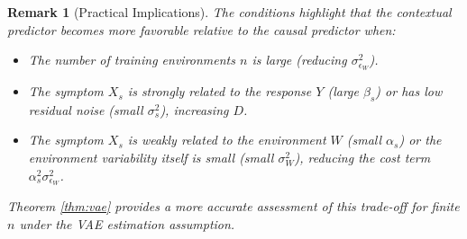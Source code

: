 \documentclass[11pt]{article}
\newtheorem{remark}{Remark}[section]
\begin{document}
\begin{remark}[Practical Implications]
The conditions highlight that the contextual predictor becomes more favorable relative to the causal predictor when:
\begin{itemize}
    \item The number of training environments $n$ is large (reducing $\sigma_{\epsilon_W}^2$).
    \item The symptom $X_s$ is strongly related to the response $Y$ (large $\beta_s$) or has low residual noise (small $\sigma_s^2$), increasing $D$.
    \item The symptom $X_s$ is weakly related to the environment $W$ (small $\alpha_s$) or the environment variability itself is small (small $\sigma_W^2$), reducing the cost term $\alpha_s^2 \sigma_{\epsilon_W}^2$.
\end{itemize}
Theorem \ref{thm:vae} provides a more accurate assessment of this trade-off for finite $n$ under the VAE estimation assumption.
\end{remark}
\end{document}
